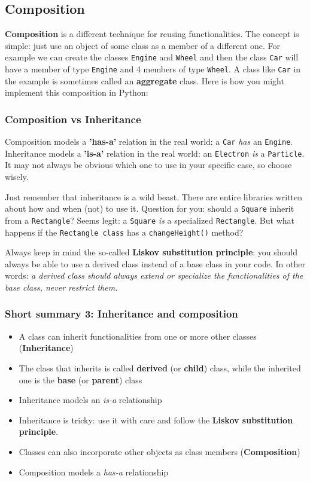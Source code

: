 \subsection{Composition}
\textbf{Composition} is a different technique for reusing functionalities. The concept is simple: just use an object of some class as a member of a different one. For example we can create the classes \texttt{Engine} and \texttt{Wheel} and then the class \texttt{Car} will have a member of type \texttt{Engine} and 4 members of type \texttt{Wheel}. A class like \texttt{Car} in the example is sometimes called an \textbf{aggregate} class. Here is how you might implement this composition in Python:



\subsubsection{Composition vs Inheritance}
Composition models a \textbf{'has-a'} relation in the real world: a \texttt{Car} \emph{has} an \texttt{Engine}. Inheritance models a \textbf{'is-a'} relation in the real world: an \texttt{Electron} \emph{is} a \texttt{Particle}. It may not always be obvious which one to use in your specific case, so choose wisely.

Just remember that inheritance is a wild beast. There are entire libraries written about how and when (not) to use it. Question for you: should a \texttt{Square} inherit from a \texttt{Rectangle}? Seems legit: a \texttt{Square} \emph{is} a specialized \texttt{Rectangle}. But what happens if the \texttt{Rectangle class} has a \texttt{changeHeight()} method?

Always keep in mind the so-called \textbf{Liskov substitution principle}: you should always be able to use a derived class instead of a base class in your code. In other words: \textit{a derived class should always extend or specialize the functionalities of the base class, never restrict them.}

\subsubsection{Short summary 3: Inheritance and composition}
\begin{itemize}
    \item A class can inherit functionalities from one or more other classes (\textbf{Inheritance})
    \item The class that inherits is called \textbf{derived} (or \textbf{child}) class, while the inherited one is the \textbf{base} (or \textbf{parent}) class
    \item Inheritance models an \emph{is-a} relationship
    \item Inheritance is tricky: use it with care and follow the \textbf{Liskov substitution principle}.
    \item Classes can also incorporate other objects as class members (\textbf{Composition})
    \item Composition models a \emph{has-a} relationship
\end{itemize}